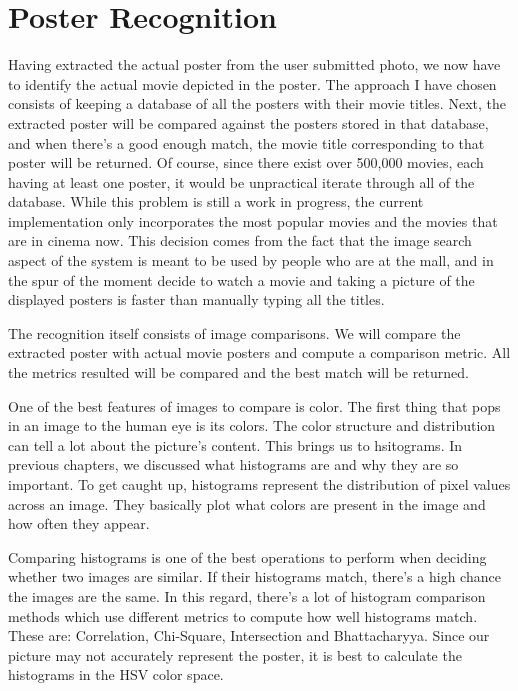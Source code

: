 \documentclass[12pt,a4paper,twoside]{report}
\begin{document}

\section{Poster Recognition}
Having extracted the actual poster from the user submitted photo, we now have to identify the actual movie depicted in the poster. The approach I have chosen consists of keeping a database of all the posters with their movie titles. Next, the extracted poster will be compared against the posters stored in that database, and when there's a good enough match, the movie title corresponding to that poster will be returned. Of course, since there exist over 500,000 movies, each having at least one poster, it would be unpractical iterate through all of the database. While this problem is still a work in progress, the current implementation only incorporates the most popular movies and the movies that are in cinema now. This decision comes from the fact that the image search aspect of the system is meant to be used by people who are at the mall, and in the spur of the moment decide to watch a movie and taking a picture of the displayed posters is faster than manually typing all the titles. 

The recognition itself consists of image comparisons. We will compare the extracted poster with actual movie posters and compute a comparison metric. All the metrics resulted will be compared and the best match will be returned.

One of the best features of images to compare is color. The first thing that pops in an image to the human eye is its colors. The color structure and distribution can tell a lot about the picture's content. This brings us to hsitograms. In previous chapters, we discussed what histograms are and why they are so important. To get caught up, histograms represent the distribution of pixel values across an image. They basically plot what colors are present in the image and how often they appear.

Comparing histograms is one of the best operations to perform when deciding whether two images are similar. If their histograms match, there's a high chance the images are the same. In this regard, there's a lot of histogram comparison methods which use different metrics to compute how well histograms match. These are: Correlation, Chi-Square, Intersection and Bhattacharyya. Since our picture may not accurately represent the poster, it is best to calculate the histograms in the HSV color space.
\end{document}
